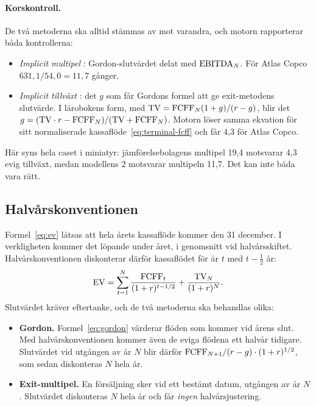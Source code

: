 \paragraph{Korskontroll.} De två metoderna ska alltid stämmas av mot varandra, och motorn
rapporterar båda kontrollerna:

\begin{itemize}
  \item \emph{Implicit multipel} : Gordon-slutvärdet delat med
    $\mathrm{EBITDA}_N$. För Atlas Copco $631,1 / 54,0 = 11,7$ gånger.
  \item \emph{Implicit tillväxt} : det $g$ som får Gordons formel
    att ge exit-metodens slutvärde. I lärobokens form, med
    $\mathrm{TV} = \mathrm{FCFF}_N(1+g)/(r-g)$, blir det $g = (\mathrm{TV} \cdot r - \mathrm{FCFF}_N)/(\mathrm{TV} + \mathrm{FCFF}_N)$.
    Motorn löser samma ekvation för sitt normaliserade kassaflöde~\eqref{eq:terminal-fcff}
    och får 4,3\pct{} för Atlas Copco.
\end{itemize}

Här syns hela caset i miniatyr: jämförelsebolagens multipel 19,4 motsvarar 4,3\pct{} evig
tillväxt, medan modellens 2\pct{} motsvarar multipeln 11,7. Det kan inte båda vara rätt.

\subsection{Halvårskonventionen}
\label{sec:midyear}

Formel~\eqref{eq:ev} låtsas att hela årets kassaflöde kommer den 31 december. I verkligheten
kommer det löpande under året, i genomsnitt vid halvårsskiftet. Halvårskonventionen
 diskonterar därför kassaflödet för år $t$ med $t - \tfrac12$ år:
\begin{equation}
  \mathrm{EV} = \sum_{t=1}^{N} \frac{\mathrm{FCFF}_t}{(1+r)^{t-1/2}} + \frac{\mathrm{TV}_N}{(1+r)^N}.
  \label{eq:ev-midyear}
\end{equation}
Slutvärdet kräver eftertanke, och de två metoderna ska behandlas olika:

\begin{itemize}
  \item \textbf{Gordon.} Formel~\eqref{eq:gordon} värderar flöden som kommer vid årens slut. Med
    halvårskonventionen kommer även de eviga flödena ett halvår tidigare. Slutvärdet vid
    utgången av år $N$ blir därför $\mathrm{FCFF}_{N+1}/(r-g) \cdot (1+r)^{1/2}$, som sedan diskonteras
    $N$ hela år.
  \item \textbf{Exit-multipel.} En försäljning sker vid ett bestämt datum, utgången av år $N$.
    Slutvärdet diskonteras $N$ hela år och får \emph{ingen} halvårsjustering.
\end{itemize}

